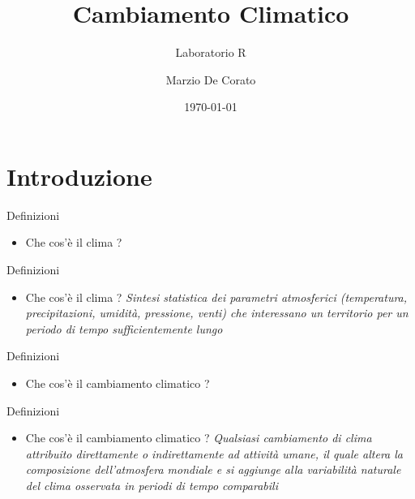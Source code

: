 \documentclass{beamer}
\title[Laboratorio R]{Cambiamento Climatico}
\subtitle{Laboratorio R}
\author{Marzio De Corato }
\date{\today}
\begin{document}
\begin{frame}
\vspace{+6.5 cm}  \titlepage
\end{frame}

\usebackgroundtemplate{ } 


\section{Introduzione}


\begin{frame}{Definizioni}
\begin{itemize}
\item Che cos'è il clima ? 
\end{itemize}
\end{frame}


\begin{frame}{Definizioni}
\begin{itemize}
\item Che cos'è il clima ? \textit{Sintesi statistica dei parametri atmosferici (temperatura, precipitazioni, umidità, pressione, venti) che interessano un
territorio per un periodo di tempo sufficientemente lungo} \cite{ispra}
\end{itemize}
\end{frame}


\begin{frame}{Definizioni}
\begin{itemize}
\item Che cos'è il cambiamento climatico ? 
\end{itemize}
\end{frame}

\begin{frame}{Definizioni}
\begin{itemize}
\item Che cos'è il cambiamento climatico ?  \textit{Qualsiasi cambiamento di clima attribuito direttamente o indirettamente ad attività umane, il quale altera la composizione dell'atmosfera mondiale e si aggiunge alla variabilità naturale del clima osservata in periodi di tempo comparabili} \cite{ispra}
\end{itemize}
\end{frame}
\end{document}
